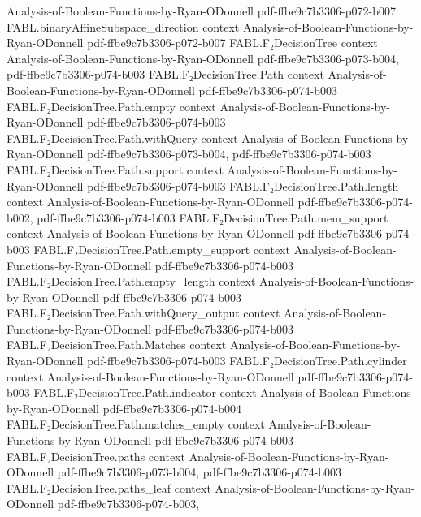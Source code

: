 \begin{theorem}
  {Analysis-of-Boolean-Functions-by-Ryan-ODonnell}
  {pdf-ffbe9c7b3306-p072-b007}
\proofstep
  {FABL.binaryAffineSubspace_direction}
  {context}
  {Analysis-of-Boolean-Functions-by-Ryan-ODonnell}
  {pdf-ffbe9c7b3306-p072-b007}
\proofstep
  {FABL.F₂DecisionTree}
  {context}
  {Analysis-of-Boolean-Functions-by-Ryan-ODonnell}
  {pdf-ffbe9c7b3306-p073-b004,
    pdf-ffbe9c7b3306-p074-b003}
\proofstep
  {FABL.F₂DecisionTree.Path}
  {context}
  {Analysis-of-Boolean-Functions-by-Ryan-ODonnell}
  {pdf-ffbe9c7b3306-p074-b003}
\proofstep
  {FABL.F₂DecisionTree.Path.empty}
  {context}
  {Analysis-of-Boolean-Functions-by-Ryan-ODonnell}
  {pdf-ffbe9c7b3306-p074-b003}
\proofstep
  {FABL.F₂DecisionTree.Path.withQuery}
  {context}
  {Analysis-of-Boolean-Functions-by-Ryan-ODonnell}
  {pdf-ffbe9c7b3306-p073-b004,
    pdf-ffbe9c7b3306-p074-b003}
\proofstep
  {FABL.F₂DecisionTree.Path.support}
  {context}
  {Analysis-of-Boolean-Functions-by-Ryan-ODonnell}
  {pdf-ffbe9c7b3306-p074-b003}
\proofstep
  {FABL.F₂DecisionTree.Path.length}
  {context}
  {Analysis-of-Boolean-Functions-by-Ryan-ODonnell}
  {pdf-ffbe9c7b3306-p074-b002,
    pdf-ffbe9c7b3306-p074-b003}
\proofstep
  {FABL.F₂DecisionTree.Path.mem_support}
  {context}
  {Analysis-of-Boolean-Functions-by-Ryan-ODonnell}
  {pdf-ffbe9c7b3306-p074-b003}
\proofstep
  {FABL.F₂DecisionTree.Path.empty_support}
  {context}
  {Analysis-of-Boolean-Functions-by-Ryan-ODonnell}
  {pdf-ffbe9c7b3306-p074-b003}
\proofstep
  {FABL.F₂DecisionTree.Path.empty_length}
  {context}
  {Analysis-of-Boolean-Functions-by-Ryan-ODonnell}
  {pdf-ffbe9c7b3306-p074-b003}
\proofstep
  {FABL.F₂DecisionTree.Path.withQuery_output}
  {context}
  {Analysis-of-Boolean-Functions-by-Ryan-ODonnell}
  {pdf-ffbe9c7b3306-p074-b003}
\proofstep
  {FABL.F₂DecisionTree.Path.Matches}
  {context}
  {Analysis-of-Boolean-Functions-by-Ryan-ODonnell}
  {pdf-ffbe9c7b3306-p074-b003}
\proofstep
  {FABL.F₂DecisionTree.Path.cylinder}
  {context}
  {Analysis-of-Boolean-Functions-by-Ryan-ODonnell}
  {pdf-ffbe9c7b3306-p074-b003}
\proofstep
  {FABL.F₂DecisionTree.Path.indicator}
  {context}
  {Analysis-of-Boolean-Functions-by-Ryan-ODonnell}
  {pdf-ffbe9c7b3306-p074-b004}
\proofstep
  {FABL.F₂DecisionTree.Path.matches_empty}
  {context}
  {Analysis-of-Boolean-Functions-by-Ryan-ODonnell}
  {pdf-ffbe9c7b3306-p074-b003}
\proofstep
  {FABL.F₂DecisionTree.paths}
  {context}
  {Analysis-of-Boolean-Functions-by-Ryan-ODonnell}
  {pdf-ffbe9c7b3306-p073-b004,
    pdf-ffbe9c7b3306-p074-b003}
\proofstep
  {FABL.F₂DecisionTree.paths_leaf}
  {context}
  {Analysis-of-Boolean-Functions-by-Ryan-ODonnell}
  {pdf-ffbe9c7b3306-p074-b003,
}
\end{theorem}
